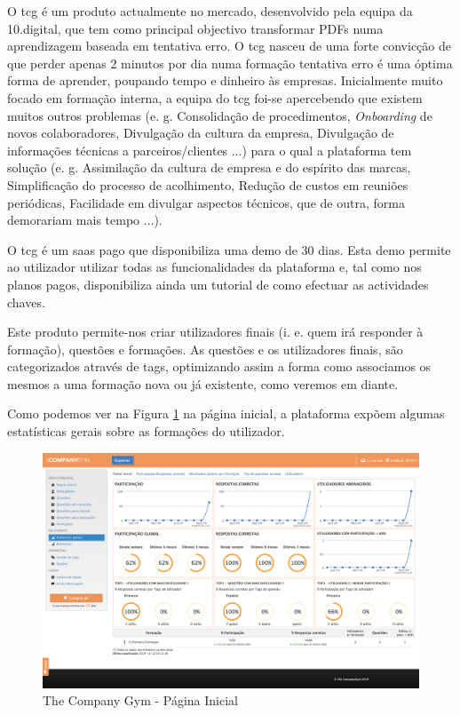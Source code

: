 O \acrlong{tcg} é um produto actualmente no mercado, desenvolvido pela equipa da 10.digital, que tem como principal objectivo transformar PDFs numa aprendizagem baseada em tentativa erro. O \acrshort{tcg} nasceu de uma forte convicção de que perder apenas 2 minutos por dia numa formação tentativa erro é uma óptima forma de aprender, poupando tempo e dinheiro às empresas. Inicialmente muito focado em formação interna, a equipa do \acrshort{tcg} foi-se apercebendo que existem muitos outros problemas (e. g. Consolidação de procedimentos, \textit{Onboarding} de novos colaboradores, Divulgação da cultura da empresa, Divulgação de informações técnicas a parceiros/clientes ...) para o qual a plataforma tem solução (e. g. Assimilação da cultura de empresa e do espírito das marcas, Simplificação do processo de acolhimento, Redução de custos em reuniões periódicas, Facilidade em divulgar aspectos técnicos, que de outra, forma demorariam mais tempo ...).\cite{tcginfo}

O \acrshort{tcg} é um \acrshort{saas} pago que disponibiliza uma demo de 30 dias. Esta demo permite ao utilizador utilizar todas as funcionalidades da plataforma e, tal como nos planos pagos, disponibiliza ainda um tutorial de como efectuar as actividades chaves.

Este produto permite-nos criar utilizadores finais (i. e. quem irá responder à formação), questões e formações. As questões e os utilizadores finais, são categorizados através de tags, optimizando assim a forma como associamos os mesmos a uma formação nova ou já existente, como veremos em diante.

Como podemos ver na Figura \ref{fig:tcg-homepage} na página inicial, a plataforma expõem algumas estatísticas gerais sobre as formações do utilizador.

\newpage


\begin{figure}[ht!]
	\begin{center}
		\includegraphics[width=1\textwidth]{img/tcg/tcg-homepage.png}
		\caption{The Company Gym - Página Inicial}
		\label{fig:tcg-homepage}
	\end{center}
\end{figure}

